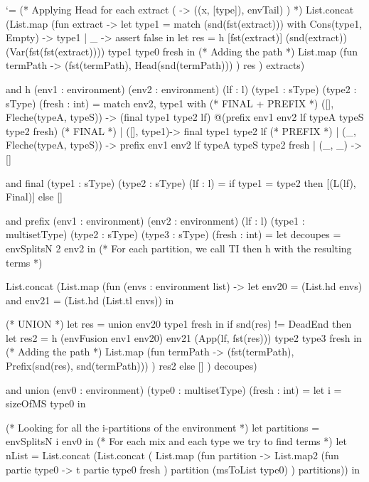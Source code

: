 \documentclass{article}
\let\origlstlisting=\lstlisting
\let\endoriglstlisting=\endlstlisting
\renewenvironment{lstlisting}
{\mathcode`\-=\hyphenmathcode
    \everymath{}\mathsurround=0pt\origlstlisting}
{\endoriglstlisting}
\begin{document}
\begin{lstlisting}
    (* Applying Head for each extract ( ->  ((x, [type]), envTail) ) *)
    List.concat 
      (List.map 
	 (fun extract -> let type1 = match (snd(fst(extract))) with
                            	   Cons(type1, Empty) -> type1
                            	 | _ -> assert false 
	  in
	    let res = h [fst(extract)] (snd(extract)) 
	                    (Var(fst(fst(extract)))) type1 type0 fresh in
        (* Adding the path *)
	     List.map (fun termPath -> (fst(termPath), Head(snd(termPath))) ) res
	 ) 
	 extracts)
    
  and h (env1 : environment) (env2 : environment) (lf : l) (type1 : sType) 
          (type2 : sType) (fresh : int) =
    match env2, type1 with
    (* FINAL + PREFIX *)
      ([], Fleche(typeA, typeS)) -> (final type1 type2 lf)
                                      @(prefix env1 env2 lf typeA typeS type2 fresh)
    (* FINAL *)
    | ([], type1)-> final type1 type2 lf
    (* PREFIX *)
    | (_, Fleche(typeA, typeS)) -> prefix env1 env2 lf typeA typeS type2 fresh
    | (_, _) -> []

  and final (type1 : sType) (type2 : sType) (lf : l) =
    if type1 = type2  then [(L(lf), Final)] else []

  and prefix (env1 : environment)  (env2 : environment) (lf : l) (type1 : multisetType)
               (type2 : sType) (type3 : sType) (fresh : int) = 
    let decoupes = envSplitsN 2 env2 in
    (* For each partition, we call TI then h with the resulting terms *)
    
    List.concat (List.map (fun (envs : environment list) -> 
	let env20 = (List.hd envs) and env21 = (List.hd (List.tl envs)) in
	
	(* UNION *)
	let res = union env20 type1 fresh in 
	if snd(res) != DeadEnd then
	  let res2 = h (envFusion env1 env20) env21 (App(lf, fst(res))) type2 type3 fresh in
	  (* Adding the path *)
	  List.map (fun termPath -> (fst(termPath), Prefix(snd(res), snd(termPath))) ) res2
	else []
    )
    decoupes)

  and union (env0 : environment) (type0 : multisetType) (fresh : int) = 
    let i = sizeOfMS type0 in
    
	(* Looking for all the i-partitions of the environment *)
    let partitions = envSplitsN i env0 in
	(* For each mix and each type we try to find terms *)
    let nList = List.concat (List.concat (
    List.map (fun partition -> 
      List.map2 (fun partie type0 -> 
          t partie type0 fresh
      ) partition (msToList type0)
    ) partitions)) in
    

\end{lstlisting}
\end{document}
